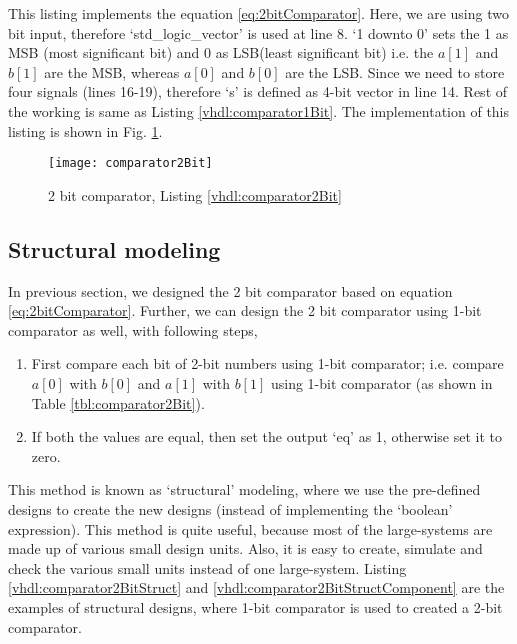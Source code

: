 \begin{explanation} 
	This listing implements the equation \ref{eq:2bitComparator}. Here, we are using two bit input, therefore `std\_logic\_vector' is used at line 8. `1 downto 0' sets the 1 as MSB (most significant bit) and 0 as LSB(least significant bit) i.e. the $a[1]$ and $b[1]$ are the MSB, whereas $a[0]$ and $b[0]$ are the LSB. Since we need to store four signals (lines 16-19), therefore `s' is defined as 4-bit vector in line 14. Rest of the working is same as Listing \ref{vhdl:comparator1Bit}. The implementation of this listing is shown in Fig. \ref{fig:comparator2Bit}. 
\end{explanation}

\begin{figure}[!h]
	\centering
	\texttt{[image: comparator2Bit]}
	\caption{2 bit comparator, Listing \ref{vhdl:comparator2Bit}}
	\label{fig:comparator2Bit}
\end{figure}

\subsection{Structural modeling}\label{sec:structureModeling}
In previous section, we designed the 2 bit comparator based on equation \ref{eq:2bitComparator}. Further, we can design the 2 bit comparator using 1-bit comparator as well, with following steps, 
\begin{enumerate}
	\item First compare each bit of 2-bit numbers using 1-bit comparator;  i.e. compare $a[0]$ with $b[0]$ and $a[1]$ with $b[1]$ using 1-bit comparator (as shown in Table \ref{tbl:comparator2Bit}). 
	
	\item If both the values are equal, then set the output `eq' as 1, otherwise set it to zero. 
\end{enumerate}

This method is known as `structural' modeling, where we use the pre-defined designs to create the new designs (instead of implementing the `boolean' expression). This method is quite useful, because most of the large-systems are made up of various small design units. Also, it is easy to create, simulate and check the various small units instead of one large-system. Listing \ref {vhdl:comparator2BitStruct} and \ref{vhdl:comparator2BitStructComponent} are the examples of structural designs, where 1-bit comparator is used to created a 2-bit comparator.  


